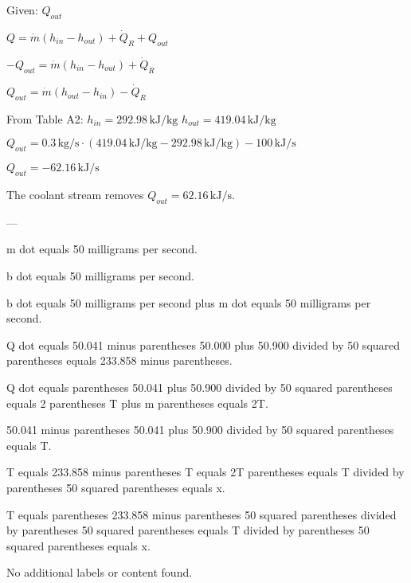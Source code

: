 Given: \( Q_{out} \)  

\( Q = \dot{m} (h_{in} - h_{out}) + \dot{Q}_R + Q_{out} \)  

\( -Q_{out} = \dot{m} (h_{in} - h_{out}) + \dot{Q}_R \)  

\( Q_{out} = \dot{m} (h_{out} - h_{in}) - \dot{Q}_R \)  

From Table A2:  
\( h_{in} = 292.98 \, \text{kJ/kg} \)  
\( h_{out} = 419.04 \, \text{kJ/kg} \)  

\( Q_{out} = 0.3 \, \text{kg/s} \cdot (419.04 \, \text{kJ/kg} - 292.98 \, \text{kJ/kg}) - 100 \, \text{kJ/s} \)  

\( Q_{out} = -62.16 \, \text{kJ/s} \)  

The coolant stream removes \( Q_{out} = 62.16 \, \text{kJ/s} \).  

---

m dot equals 50 milligrams per second.  

b dot equals 50 milligrams per second.  

b dot equals 50 milligrams per second plus m dot equals 50 milligrams per second.  

Q dot equals 50.041 minus parentheses 50.000 plus 50.900 divided by 50 squared parentheses equals 233.858 minus parentheses.  

Q dot equals parentheses 50.041 plus 50.900 divided by 50 squared parentheses equals 2 parentheses T plus m parentheses equals 2T.  

50.041 minus parentheses 50.041 plus 50.900 divided by 50 squared parentheses equals T.  

T equals 233.858 minus parentheses T equals 2T parentheses equals T divided by parentheses 50 squared parentheses equals x.  

T equals parentheses 233.858 minus parentheses 50 squared parentheses divided by parentheses 50 squared parentheses equals T divided by parentheses 50 squared parentheses equals x.  

No additional labels or content found.